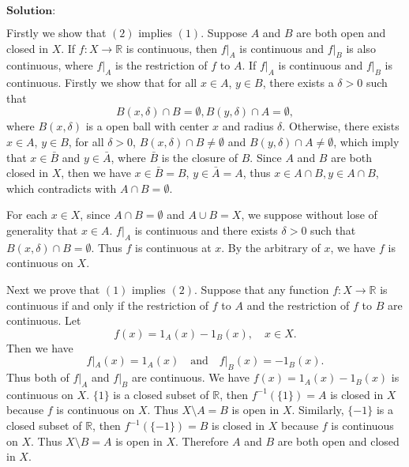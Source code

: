 \documentclass[12pt,a4paper]{ctexart}
\begin{document}
\vspace{8pt}
$\textbf{Solution:}$

Firstly we show that $(2)$ implies $(1)$. Suppose $A$ and $B$ are both open and closed in $X$. If $f: X \to \mathbb R$ is continuous, then $f|_{A}$ is continuous and $f|_{B}$ is also continuous, where $f|_{A}$ is the restriction of $f$ to $A$. If $f|_{A}$ is continuous and $f|_{B}$ is continuous. Firstly we show that for all $x \in A$, $y \in B$, there exists a $\delta > 0$ such that
$$B(x, \delta) \cap B = \emptyset, B(y, \delta) \cap A = \emptyset,$$
where $B(x, \delta)$ is a open ball with center $x$ and radius $\delta$. Otherwise, there exists $x \in A$, $y \in B$, for all $\delta > 0$, $B(x, \delta) \cap B \neq \emptyset$ and $B(y, \delta) \cap A \neq \emptyset$, which imply that $x \in \bar{B}$ and $y \in \bar{A}$, where $\bar{B}$ is the closure of $B$. Since $A$ and $B$ are both closed in $X$, then we have $x \in \bar{B} = B$, $y \in \bar{A} = A$, thus $x \in A \cap B, y \in A \cap B$, which contradicts with $A \cap B = \emptyset$.

For each $x \in X$, since $A \cap B = \emptyset$ and $A \cup B = X$, we suppose without lose of generality that $x \in A$. $f|_{A}$ is continuous and there exists $\delta > 0$ such that $B(x, \delta) \cap B = \emptyset$. Thus $f$ is continuous at $x$. By the arbitrary of $x$, we have $f$ is continuous on $X$.

Next we prove that $(1)$ implies $(2)$. Suppose that any function $f: X \to \mathbb R$ is continuous if and only if the restriction of $f$ to $A$ and the restriction of $f$ to $B$ are continuous. Let
$$f(x) = 1_{A}(x) - 1_{B}(x), \quad x \in X.$$
Then we have
$$f|_{A} (x) = 1_{A}(x) \quad \text{and} \quad f|_{B} (x) = -1_{B}(x).$$
Thus both of $f|_{A}$ and $f|_{B}$ are continuous. We have $f(x) = 1_{A}(x) - 1_{B}(x)$ is continuous on $X$. $\{1\}$ is a closed subset of $\mathbb R$, then $f^{-1}(\{1\}) = A$ is closed in $X$ because $f$ is continuous on $X$. Thus $X \setminus A =B$ is open in $X$. Similarly, $\{-1\}$ is a closed subset of $\mathbb R$, then $f^{-1}(\{-1\}) = B$ is closed in $X$ because $f$ is continuous on $X$. Thus $X \setminus B = A$ is open in $X$. Therefore $A$ and $B$ are both open and closed in $X$.
\end{document}
